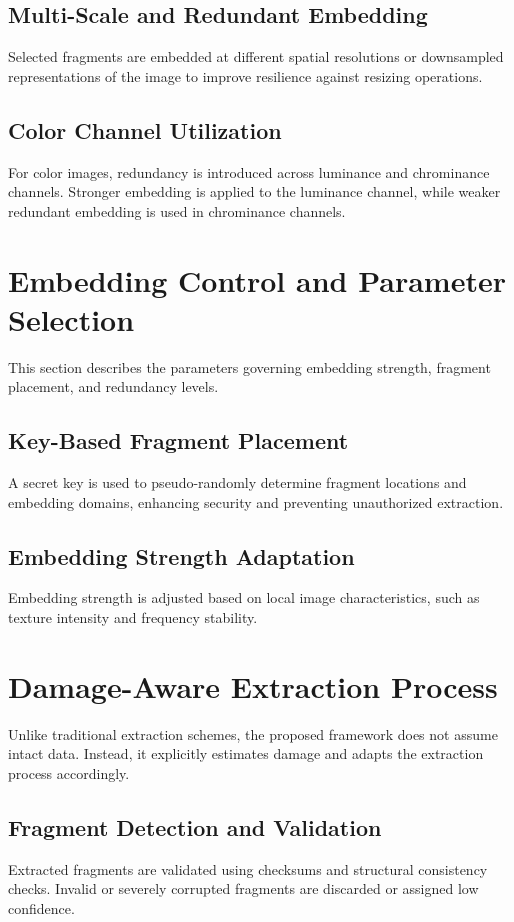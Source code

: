 \documentclass[12pt,a4paper,oneside]{report}
\begin{document}
	\subsection{Multi-Scale and Redundant Embedding}
	Selected fragments are embedded at different spatial resolutions or downsampled representations of the image to improve resilience against resizing operations.
	
	\subsection{Color Channel Utilization}
	For color images, redundancy is introduced across luminance and chrominance channels. Stronger embedding is applied to the luminance channel, while weaker redundant embedding is used in chrominance channels.
	
	\section{Embedding Control and Parameter Selection}
	This section describes the parameters governing embedding strength, fragment placement, and redundancy levels.
	
	\subsection{Key-Based Fragment Placement}
	A secret key is used to pseudo-randomly determine fragment locations and embedding domains, enhancing security and preventing unauthorized extraction.
	
	\subsection{Embedding Strength Adaptation}
	Embedding strength is adjusted based on local image characteristics, such as texture intensity and frequency stability.
	
	\section{Damage-Aware Extraction Process}
	Unlike traditional extraction schemes, the proposed framework does not assume intact data. Instead, it explicitly estimates damage and adapts the extraction process accordingly.
	
	\subsection{Fragment Detection and Validation}
	Extracted fragments are validated using checksums and structural consistency checks. Invalid or severely corrupted fragments are discarded or assigned low confidence.
	
\end{document}
